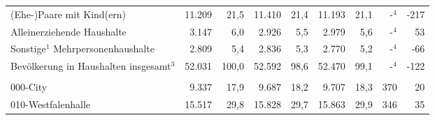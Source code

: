 \documentclass[
  a4paper,
  twoside]{article}
\begin{document}
\begin{table}[!h]
{\begin{threeparttable}
\begin{tabular}[t]{>{}l>{}r>{}r>{}r>{}r>{}r>{}r>{}r>{}r}
\hspace{1em}\hspace{1em}\textcolor{DoGray}{(Ehe-)Paare mit Kind(ern)} & \textcolor{DoGray}{11.209} & \textcolor{DoGray}{21,5} & \textcolor{DoGray}{11.410} & \textcolor{DoGray}{21,4} & \textcolor{DoGray}{11.193} & \textcolor{DoGray}{21,1} & \textcolor{DoGray}{-$^{4}$} & \textcolor{DoGray}{-217}\\
\hspace{1em}\hspace{1em}\textcolor{DoGray}{Alleinerziehende Haushalte} & \textcolor{DoGray}{3.147} & \textcolor{DoGray}{6,0} & \textcolor{DoGray}{2.926} & \textcolor{DoGray}{5,5} & \textcolor{DoGray}{2.979} & \textcolor{DoGray}{5,6} & \textcolor{DoGray}{-$^{4}$} & \textcolor{DoGray}{53}\\
\hspace{1em}\hspace{1em}\textcolor{DoGray}{Sonstige$^{1}$ Mehrpersonenhaushalte} & \textcolor{DoGray}{2.809} & \textcolor{DoGray}{5,4} & \textcolor{DoGray}{2.836} & \textcolor{DoGray}{5,3} & \textcolor{DoGray}{2.770} & \textcolor{DoGray}{5,2} & \textcolor{DoGray}{-$^{4}$} & \textcolor{DoGray}{-66}\\
\hspace{1em}\hspace{1em}\textcolor{DoGray}{Bevölkerung in Haushalten insgesamt$^{3}$} & \textcolor{DoGray}{52.031} & \textcolor{DoGray}{100,0} & \textcolor{DoGray}{52.592} & \textcolor{DoGray}{98,6} & \textcolor{DoGray}{52.470} & \textcolor{DoGray}{99,1} & \textcolor{DoGray}{-$^{4}$} & \textcolor{DoGray}{-122}\\
\addlinespace[0.3em]
\multicolumn{9}{l}{\textcolor[HTML]{044891}{Bevölkerung nach Statistischen Bezirken}}\\
\hspace{1em}\hspace{1em}\textcolor{DoGray}{000-City} & \textcolor{DoGray}{9.337} & \textcolor{DoGray}{17,9} & \textcolor{DoGray}{9.687} & \textcolor{DoGray}{18,2} & \textcolor{DoGray}{9.707} & \textcolor{DoGray}{18,3} & \textcolor{DoGray}{370} & \textcolor{DoGray}{20}\\
\hspace{1em}\hspace{1em}\textcolor{DoGray}{010-Westfalenhalle} & \textcolor{DoGray}{15.517} & \textcolor{DoGray}{29,8} & \textcolor{DoGray}{15.828} & \textcolor{DoGray}{29,7} & \textcolor{DoGray}{15.863} & \textcolor{DoGray}{29,9} & \textcolor{DoGray}{346} & \textcolor{DoGray}{35}\\

\end{tabular}
\end{threeparttable}}
\end{table}
\end{document}
